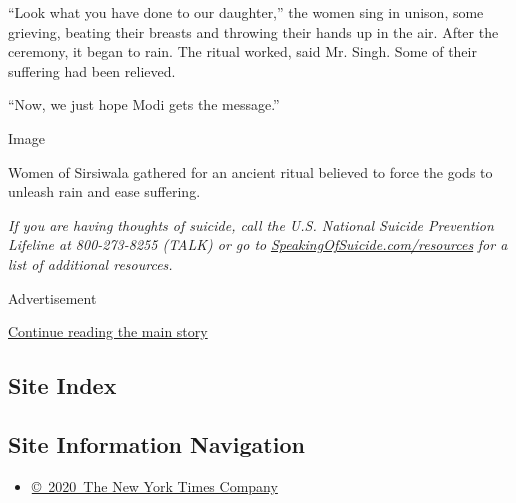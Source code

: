 ``Look what you have done to our daughter,'' the women sing in unison,
some grieving, beating their breasts and throwing their hands up in the
air. After the ceremony, it began to rain. The ritual worked, said Mr.
Singh. Some of their suffering had been relieved.

``Now, we just hope Modi gets the message.''

Image

Women of Sirsiwala gathered for an ancient ritual believed to force the
gods to unleash rain and ease suffering.~

\emph{If you are having thoughts of suicide, call the U.S. National
Suicide Prevention Lifeline at 800-273-8255 (TALK) or go to}
\href{http://speakingofsuicide.com/resources}{\emph{SpeakingOfSuicide.com/resources}}
\emph{for a list of additional resources.}

Advertisement

\protect\hyperlink{after-bottom}{Continue reading the main story}

\hypertarget{site-index}{%
\subsection{Site Index}\label{site-index}}

\hypertarget{site-information-navigation}{%
\subsection{Site Information
Navigation}\label{site-information-navigation}}

\begin{itemize}
\tightlist
\item
  \href{https://help.nytimes3xbfgragh.onion/hc/en-us/articles/115014792127-Copyright-notice}{©~2020~The
  New York Times Company}
\end{itemize}

